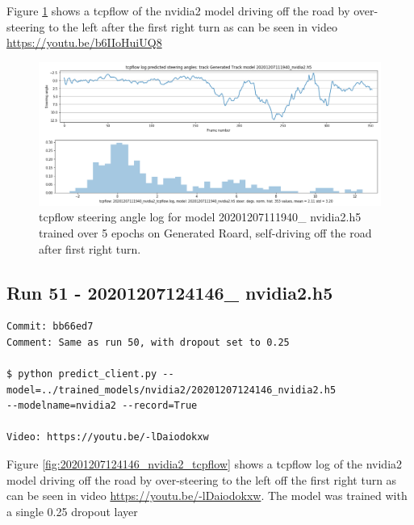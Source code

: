 Figure \ref{fig:20201207111940_nvidia2_tcpflow} shows a tcpflow of the nvidia2 model driving off the road by over-steering to the left after the first right turn as can be seen in video \url{https://youtu.be/b6IIoHuiUQ8} 

\begin{figure}[ht]
 \centering 
 \includegraphics[width=\textwidth]{Figures/20201207111940_nvidia2_tcpflow.png}
 \caption{tcpflow steering angle log for model 20201207111940\_ nvidia2.h5 trained over 5 epochs on Generated Roard, self-driving off the road after first right turn.}
 \label{fig:20201207111940_nvidia2_tcpflow}
\end{figure}

\subsection{Run 51 - 20201207124146\_ nvidia2.h5 }
\begin{verbatim}
Commit: bb66ed7
Comment: Same as run 50, with dropout set to 0.25

$ python predict_client.py --model=../trained_models/nvidia2/20201207124146_nvidia2.h5
--modelname=nvidia2 --record=True

Video: https://youtu.be/-lDaiodokxw

\end{verbatim}

Figure \ref{fig:20201207124146_nvidia2_tcpflow} shows a tcpflow log of the nvidia2 model driving off the road by over-steering to the left off the first right turn as can be seen in video \url{https://youtu.be/-lDaiodokxw}. The model was trained with a single 0.25 dropout layer

